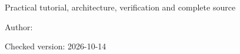 \begin{titlepage}
\thispagestyle{plain}
\centering
\vspace*{18mm}
{\color{accent}\Huge\bfseries\ReportTitle\par}
\vspace{8mm}
{\Large Practical tutorial, architecture, verification and complete source\par}
\vspace{18mm}
{\Large Author: \AuthorName\par}
\vfill
{\large Checked version: 2026-10-14\par}
\vspace{10mm}
{\ContactHeading\par}
\medskip
\ContactRows
\vspace{14mm}
\end{titlepage}
